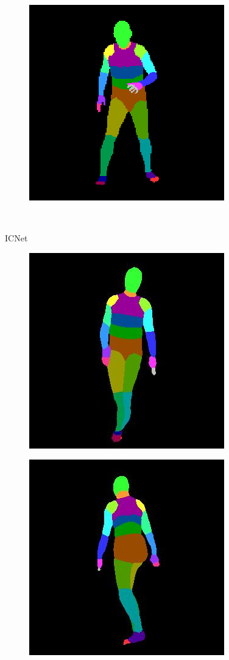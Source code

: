 \documentclass{beamer}
\begin{document}
\begin{frame}
\begin{figure}
\begin{subfigure}{.19\textwidth}
\end{subfigure}
\begin{subfigure}{.19\textwidth}
  \centering
  \includegraphics[scale=0.12]{104_52_c0002_segm_64.png}\\
\end{subfigure}\\
\end{figure}
\begin{figure}
ICNet
\centering
\begin{subfigure}{.198\textwidth}
\centering
  \includegraphics[scale=0.12]{ung_104_36_c0011_7_ice.jpg}
\end{subfigure}%
\begin{subfigure}{.19\textwidth}
  \centering
  \includegraphics[scale=0.12]{36_10_c0019_10_ice.jpg}

\end{subfigure}
\end{figure}
\end{frame}
\end{document}
